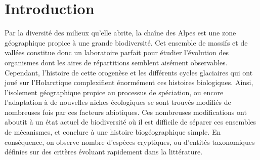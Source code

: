 \section{Introduction}

Par la diversité des milieux qu'elle abrite, la chaîne des Alpes est une zone géographique propice à une grande biodiversité.
 Cet ensemble de massifs et de vallées constitue donc un laboratoire parfait pour étudier l'évolution des organismes dont les aires de répartitions semblent aisément observables.
Cependant, l'histoire de cette orogenèse et les différents cycles glaciaires qui ont joué sur l'Holarctique complexifient énormément ces histoires biologiques.
 Ainsi, l'isolement géographique propice au processus de spéciation, ou encore l'adaptation à de nouvelles niches écologiques se sont trouvés modifiés de nombreuses fois par ces facteurs abiotiques.
 Ces nombreuses modifications ont aboutit à un état actuel de biodiversité où il est difficile de séparer ces ensembles de mécanismes, et conclure à une histoire biogéographique simple.
 En conséquence, on observe nombre d'espèces cryptiques, ou d'entités taxonomiques définies sur des critères évoluant rapidement dans la littérature.

